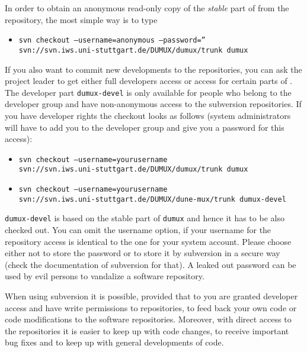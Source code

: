 In order to obtain an anonymous read-only copy of the \emph{stable} part of \Dumux from the repository, the most simple way is to type
\begin{itemize}
\item \texttt{svn checkout --username=anonymous --password=''\\
    \hspace{4cm}  svn://svn.iws.uni-stuttgart.de/DUMUX/dumux/trunk dumux}
\end{itemize}

If you also want to commit new developments to the repositories, you can ask the \Dumux project leader to get either full developers access or access for certain parts of \Dumux. 
The developer part \texttt{dumux-devel} is only available for people who belong to the \Dumux developer group and have non-anonymous access to the subversion repositories. 
If you have developer rights the checkout looks as follows (system administrators will have to add you to the developer group and  give you a password for this access): 
\begin{itemize}
 \item \texttt{svn checkout --username=yourusername \\ 
      \hspace{4cm} svn://svn.iws.uni-stuttgart.de/DUMUX/dumux/trunk dumux}
 \item \texttt{svn checkout --username=yourusername \\
      \hspace{4cm} svn://svn.iws.uni-stuttgart.de/DUMUX/dune-mux/trunk dumux-devel}
\end{itemize} 
\texttt{dumux-devel} is based on the stable part of \texttt{dumux} and hence it has to be also checked out. 
You can omit the username option, if your username for the repository access is identical to the one for your system account.
Please choose either not to store the password or to store it by subversion in a secure way (check the documentation of subversion for that). 
A leaked out password can be used by evil persons to vandalize a software repository.

When using subversion it is possible, provided that to you are granted developer access and have write permissions to repositories, to feed back your own code or code modifications to the software repositories. 
Moreover, with direct access to the repositories it is easier to keep up with code changes, to receive important bug fixes and to keep up with general developments of code.

